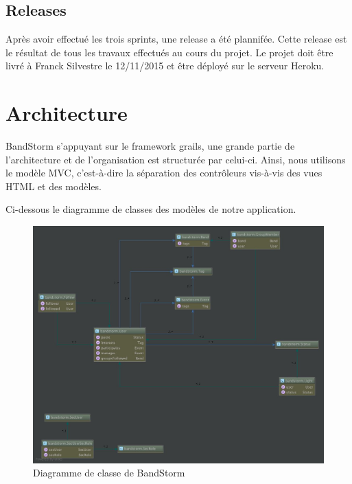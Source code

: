 \documentclass[12pt,a4paper,oneside]{book}
\begin{document}
	\section{Releases}
	Après avoir effectué les trois sprints, une release a été plannifée. Cette release est le résultat de tous les travaux
	effectués au cours du projet. Le projet doit être livré à Franck Silvestre le 12/11/2015 et être déployé sur le serveur Heroku.

	\chapter{Architecture}
	BandStorm s'appuyant sur le framework grails, une grande partie de l'architecture et de l'organisation est structurée par
	celui-ci. Ainsi, nous utilisons le modèle MVC, c'est-à-dire la séparation des contrôleurs vis-à-vis des vues HTML et des
	modèles. 

	Ci-dessous le diagramme de classes des modèles de notre application.
	\begin{figure}[H]
		\hspace{-33px}
		\includegraphics[width=20cm]{classes.png}
		\caption{Diagramme de classe de BandStorm}
	\end{figure}
\end{document}
